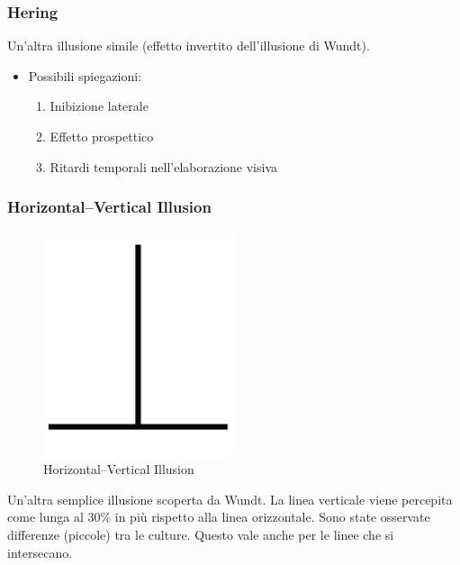   \subsubsection{Hering}
  Un'altra illusione simile (effetto invertito dell'illusione di Wundt).
\begin{itemize}
    \item Possibili spiegazioni:
    \begin{enumerate}
        \item Inibizione laterale
        \item Effetto prospettico
        \item Ritardi temporali nell'elaborazione visiva
    \end{enumerate}
\end{itemize}

  \subsubsection{Horizontal–Vertical Illusion}
  \begin{figure}[H]
    \centering
    \includegraphics[width=0.5\textwidth]{images/HorizontalVertical.png} 
    \caption{Horizontal–Vertical Illusion}
    \label{fig:immagine}
\end{figure}
  Un'altra semplice illusione scoperta da Wundt.
  La linea verticale viene percepita come lunga al 30\% in più rispetto alla linea orizzontale.
  Sono state osservate differenze (piccole) tra le culture.
  Questo vale anche per le linee che si intersecano.
